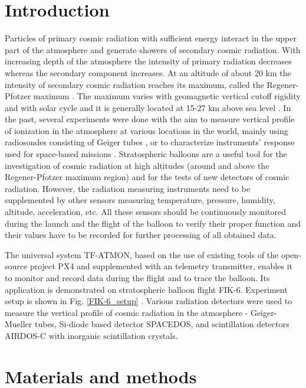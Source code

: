 \documentclass{Rpd}
\begin{document}
\section{Introduction}

Particles of primary cosmic radiation with sufficient energy interact in the upper part of the atmosphere and generate showers of secondary cosmic radiation. With increasing depth of the atmosphere the intensity of primary radiation decreases whereas the secondary component increases. At an altitude of about 20 km the intensity of secondary cosmic radiation reaches its maximum, called the Regener-Pfotzer maximum \cite{Regener, Pfotzer}. The maximum varies with geomagnetic vertical cutoff rigidity and with solar cycle and it is generally located at 15-27 km above sea level \cite{Bazilevskaya}.
In the past, several experiments were done with the aim to measure vertical profile of ionization in the atmosphere at various locations in the world, mainly using radiosondes consisting of Geiger tubes \cite{Bazilevskaya, ionization_profile, Vertical_profile_measurements, cosmic_ray_intensity, Radioactivity_atmosphere}, or to characterize instruments’ response used for space-based missions \cite{Lawrence, Mukherjee, Timepix}.
Stratospheric balloons are a useful tool for the investigation of cosmic radiation at high altitudes (around and above the Regener-Pfotzer maximum region) and for the tests of new detectors of cosmic radiation.
However, the radiation measuring instruments need to be supplemented by other sensors measuring temperature, pressure, humidity, altitude, acceleration, etc.  All these sensors should be continuously monitored during the launch and the flight of the balloon to verify their proper function and their values have to be recorded for further processing of all obtained data.

The universal system TF-ATMON, based on the use of existing tools of the open-source project PX4 and supplemented with an telemetry transmitter, enables it to monitor and record data during the flight and to trace the balloon. Its application is demonstrated on stratospheric balloon flight FIK-6. Experiment setup is shown in Fig. \ref{FIK-6_setup} . Various radiation detectors were used to measure the vertical profile of cosmic radiation in the atmosphere - Geiger-Mueller tubes, Si-diode based detector SPACEDOS, and scintillation detectors AIRDOS-C with inorganic scintillation crystals.

\section{Materials and methods}
\end{document}
